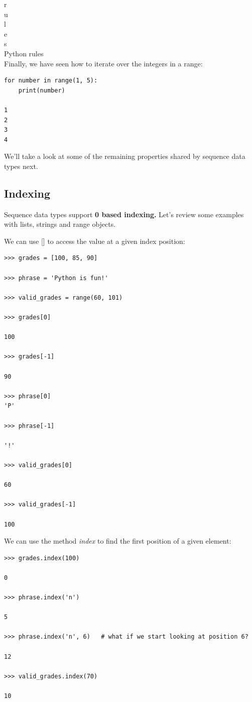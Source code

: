 \documentclass{article}
\begin{document}
r\\
u\\
l\\
e\\
s\\
Python rules\\
 
Finally, we  have seen how to iterate over the integers in a range:

\begin{lstlisting} 
for number in range(1, 5):
    print(number)
 
1
2
3
4
\end{lstlisting}

We'll take a look at some of the remaining properties shared by sequence data types next.

\subsection{Indexing}

Sequence data types support \textbf{0 based indexing.}  Let's review some examples with lists, strings and range objects.

We can use [] to access the value at a given index position:

\begin{lstlisting}
>>> grades = [100, 85, 90]

>>> phrase = 'Python is fun!'

>>> valid_grades = range(60, 101)

>>> grades[0]

100

>>> grades[-1]

90

>>> phrase[0]
'P'

>>> phrase[-1]

'!'

>>> valid_grades[0]

60

>>> valid_grades[-1]

100
\end{lstlisting}

We can use the method \textit{index} to find the first position of a given element:

\begin{lstlisting}
>>> grades.index(100)

0

>>> phrase.index('n')

5

>>> phrase.index('n', 6)   # what if we start looking at position 6?

12

>>> valid_grades.index(70)

10
\end{lstlisting}
\end{document}
